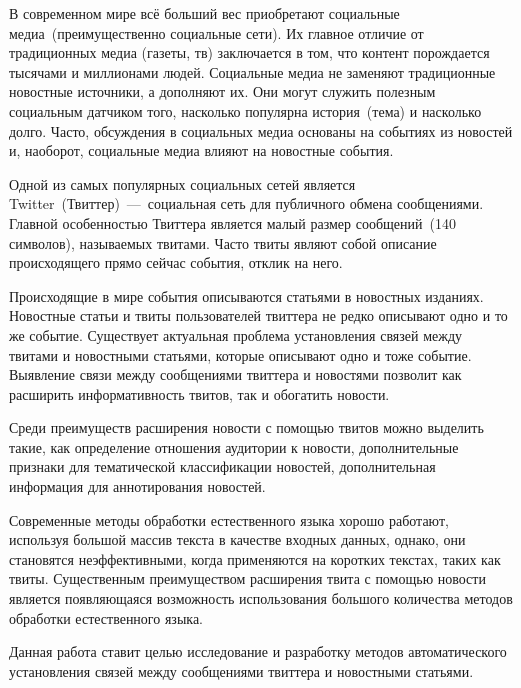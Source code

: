 \introductiontitle
    В современном мире всё больший вес приобретают социальные медиа~(преимущественно социальные сети).
    Их главное отличие от традиционных медиа (газеты, тв) заключается в том, что контент порождается тысячами и миллионами людей.
    Социальные медиа не заменяют традиционные новостные источники, а дополняют их.
    Они могут служить полезным социальным датчиком того, насколько популярна история~(тема) и насколько долго.
    Часто, обсуждения в социальных медиа основаны на событиях из новостей и, наоборот, социальные медиа влияют на новостные события.

    Одной из самых популярных социальных сетей является Twitter~(Твиттер)~---~социальная сеть для публичного обмена сообщениями.
    Главной особенностью Твиттера является малый размер сообщений~(140 символов), называемых твитами.
    Часто твиты являют собой описание происходящего прямо сейчас события, отклик на него.

    Происходящие в мире события описываются статьями в новостных изданиях.
    Новостные статьи и твиты пользователей твиттера не редко описывают одно и то же событие.
    Существует актуальная проблема установления связей между твитами и новостными статьями, которые описывают одно и тоже событие.
    Выявление связи между сообщениями твиттера и новостями позволит как расширить информативность твитов, так и обогатить новости.

    Среди преимуществ расширения новости с помощью твитов можно выделить такие, как определение отношения аудитории к новости,
    дополнительные признаки для тематической классификации новостей, дополнительная информация для аннотирования новостей.

    Современные методы обработки естественного языка хорошо работают, используя большой массив текста в качестве входных данных, однако, они становятся неэффективными,
    когда применяются на коротких текстах, таких как твиты.
    Существенным преимуществом расширения твита с помощью новости является появляющаяся возможность использования большого количества методов обработки естественного языка.

    Данная работа ставит целью исследование и разработку методов автоматического установления связей между сообщениями твиттера и новостными статьями.

    \clearpage
